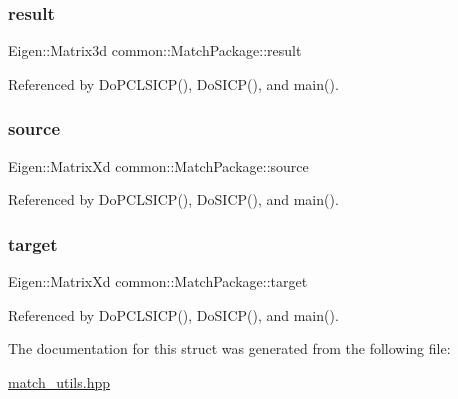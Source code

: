 \subsubsection{\texorpdfstring{result}{result}}
{\footnotesize\ttfamily Eigen\+::\+Matrix3d common\+::\+Match\+Package\+::result}



Referenced by Do\+P\+C\+L\+S\+I\+C\+P(), Do\+S\+I\+C\+P(), and main().

\mbox{\label{structcommon_1_1MatchPackage_a1eafbc6a1740dde4ab7adf0e55728880}} 
\subsubsection{\texorpdfstring{source}{source}}
{\footnotesize\ttfamily Eigen\+::\+Matrix\+Xd common\+::\+Match\+Package\+::source}



Referenced by Do\+P\+C\+L\+S\+I\+C\+P(), Do\+S\+I\+C\+P(), and main().

\mbox{\label{structcommon_1_1MatchPackage_a99634972d12f9a982c16c0adc1fe18b2}} 
\subsubsection{\texorpdfstring{target}{target}}
{\footnotesize\ttfamily Eigen\+::\+Matrix\+Xd common\+::\+Match\+Package\+::target}



Referenced by Do\+P\+C\+L\+S\+I\+C\+P(), Do\+S\+I\+C\+P(), and main().



The documentation for this struct was generated from the following file\+:\begin{DoxyCompactItemize}
\item 
\hyperlink{match__utils_8hpp}{match\+\_\+utils.\+hpp}\end{DoxyCompactItemize}
